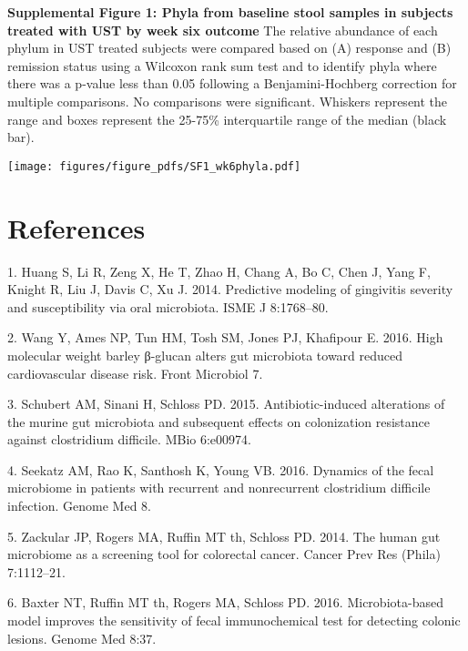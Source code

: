 \documentclass[12pt,]{article}
\begin{document}
\newpage

\textbf{Supplemental Figure 1: Phyla from baseline stool samples in
subjects treated with UST by week six outcome} The relative abundance of
each phylum in UST treated subjects were compared based on (A) response
and (B) remission status using a Wilcoxon rank sum test and to identify
phyla where there was a p-value less than 0.05 following a
Benjamini-Hochberg correction for multiple comparisons. No comparisons
were significant. Whiskers represent the range and boxes represent the
25-75\% interquartile range of the median (black bar).

\texttt{[image: figures/figure\_pdfs/SF1\_wk6phyla.pdf]}

\newpage

\section*{References}\label{references}

\hypertarget{refs}{}
\hypertarget{ref-Huang_gingivitis_2014}{}
1. Huang S, Li R, Zeng X, He T, Zhao H, Chang A, Bo C, Chen J, Yang F,
Knight R, Liu J, Davis C, Xu J. 2014. Predictive modeling of gingivitis
severity and susceptibility via oral microbiota. ISME J 8:1768--80.

\hypertarget{ref-Wang_cvdrisk_2016}{}
2. Wang Y, Ames NP, Tun HM, Tosh SM, Jones PJ, Khafipour E. 2016. High
molecular weight barley β-glucan alters gut microbiota toward reduced
cardiovascular disease risk. Front Microbiol 7.

\hypertarget{ref-Schubert_cdiff_2015}{}
3. Schubert AM, Sinani H, Schloss PD. 2015. Antibiotic-induced
alterations of the murine gut microbiota and subsequent effects on
colonization resistance against clostridium difficile. MBio 6:e00974.

\hypertarget{ref-Seekatz_cdiff_2016}{}
4. Seekatz AM, Rao K, Santhosh K, Young VB. 2016. Dynamics of the fecal
microbiome in patients with recurrent and nonrecurrent clostridium
difficile infection. Genome Med 8.

\hypertarget{ref-zackular_CRC_2014}{}
5. Zackular JP, Rogers MA, Ruffin MT th, Schloss PD. 2014. The human gut
microbiome as a screening tool for colorectal cancer. Cancer Prev Res
(Phila) 7:1112--21.

\hypertarget{ref-baxter_FIT_2016}{}
6. Baxter NT, Ruffin MT th, Rogers MA, Schloss PD. 2016.
Microbiota-based model improves the sensitivity of fecal immunochemical
test for detecting colonic lesions. Genome Med 8:37.
\end{document}
